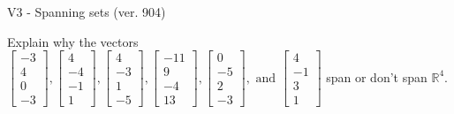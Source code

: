 \begin{exercise}
  \begin{exerciseTitle}V3 - Spanning sets (ver. 904)\end{exerciseTitle}
  \begin{exerciseStatement}
    Explain why the vectors \(\left[\begin{array}{r}
-3 \\
4 \\
0 \\
-3
\end{array}\right] , \left[\begin{array}{r}
4 \\
-4 \\
-1 \\
1
\end{array}\right] , \left[\begin{array}{r}
4 \\
-3 \\
1 \\
-5
\end{array}\right] , \left[\begin{array}{r}
-11 \\
9 \\
-4 \\
13
\end{array}\right] , \left[\begin{array}{r}
0 \\
-5 \\
2 \\
-3
\end{array}\right] , \text{ and } \left[\begin{array}{r}
4 \\
-1 \\
3 \\
1
\end{array}\right]\) span or don't span \(\mathbb{R}^4\). 
	



\end{exerciseStatement}
\end{exercise}
